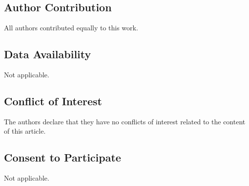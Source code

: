 \documentclass[11pt, reqno]{amsart}
\theoremstyle{definition}
\theoremstyle{remark}
\numberwithin{equation}{section}
\begin{document}
\subsection*{Author Contribution} All authors contributed equally to this work.
\subsection*{Data Availability} Not applicable.
\subsection*{Conflict of Interest} The authors declare that they have no conflicts of interest related to the content of this article.
\subsection*{Consent to Participate} Not applicable.
\end{document}
